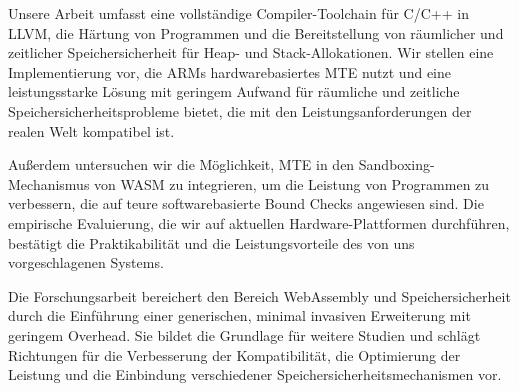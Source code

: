 Unsere Arbeit umfasst eine vollständige Compiler-Toolchain für C/C++ in LLVM, die Härtung von Programmen und die Bereitstellung von räumlicher und zeitlicher Speichersicherheit für Heap- und Stack-Allokationen.
Wir stellen eine Implementierung vor, die ARMs hardwarebasiertes \acf*{MTE} nutzt und eine leistungsstarke Lösung mit geringem Aufwand für räumliche und zeitliche Speichersicherheitsprobleme bietet, die mit den Leistungsanforderungen der realen Welt kompatibel ist.

Außerdem untersuchen wir die Möglichkeit, \acs*{MTE} in den Sandboxing-Mechanismus von \acs*{WASM} zu integrieren, um die Leistung von Programmen zu verbessern, die auf teure softwarebasierte Bound Checks angewiesen sind.
Die empirische Evaluierung, die wir auf aktuellen Hardware-Plattformen durchführen, bestätigt die Praktikabilität und die Leistungsvorteile des von uns vorgeschlagenen Systems.

Die Forschungsarbeit bereichert den Bereich WebAssembly und Speichersicherheit durch die Einführung einer generischen, minimal invasiven Erweiterung mit geringem Overhead.
Sie bildet die Grundlage für weitere Studien und schlägt Richtungen für die Verbesserung der Kompatibilität, die Optimierung der Leistung und die Einbindung verschiedener Speichersicherheitsmechanismen vor.
